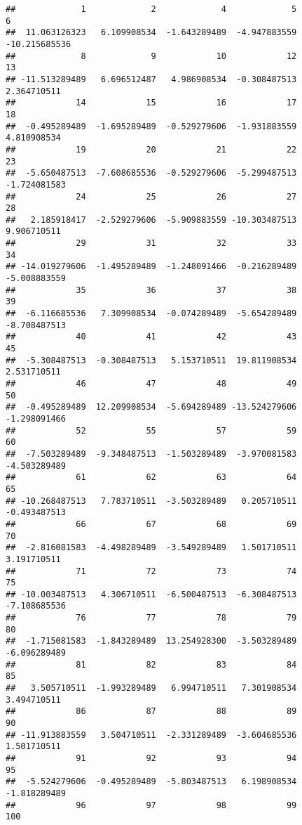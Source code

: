 \documentclass[
]{article}
\begin{document}
\begin{verbatim}
##             1             2             4             5             6 
##  11.063126323   6.109908534  -1.643289489  -4.947883559 -10.215685536 
##             8             9            10            12            13 
## -11.513289489   6.696512487   4.986908534  -0.308487513   2.364710511 
##            14            15            16            17            18 
##  -0.495289489  -1.695289489  -0.529279606  -1.931883559   4.810908534 
##            19            20            21            22            23 
##  -5.650487513  -7.608685536  -0.529279606  -5.299487513  -1.724081583 
##            24            25            26            27            28 
##   2.185918417  -2.529279606  -5.909883559 -10.303487513   9.906710511 
##            29            31            32            33            34 
## -14.019279606  -1.495289489  -1.248091466  -0.216289489  -5.008883559 
##            35            36            37            38            39 
##  -6.116685536   7.309908534  -0.074289489  -5.654289489  -8.708487513 
##            40            41            42            43            45 
##  -5.308487513  -0.308487513   5.153710511  19.811908534   2.531710511 
##            46            47            48            49            50 
##  -0.495289489  12.209908534  -5.694289489 -13.524279606  -1.298091466 
##            52            55            57            59            60 
##  -7.503289489  -9.348487513  -1.503289489  -3.970081583  -4.503289489 
##            61            62            63            64            65 
## -10.268487513   7.783710511  -3.503289489   0.205710511  -0.493487513 
##            66            67            68            69            70 
##  -2.816081583  -4.498289489  -3.549289489   1.501710511   3.191710511 
##            71            72            73            74            75 
## -10.003487513   4.306710511  -6.500487513  -6.308487513  -7.108685536 
##            76            77            78            79            80 
##  -1.715081583  -1.843289489  13.254928300  -3.503289489  -6.096289489 
##            81            82            83            84            85 
##   3.505710511  -1.993289489   6.994710511   7.301908534   3.494710511 
##            86            87            88            89            90 
## -11.913883559   3.504710511  -2.331289489  -3.604685536   1.501710511 
##            91            92            93            94            95 
##  -5.524279606  -0.495289489  -5.803487513   6.198908534  -1.818289489 
##            96            97            98            99           100 

\end{verbatim}
\end{document}
